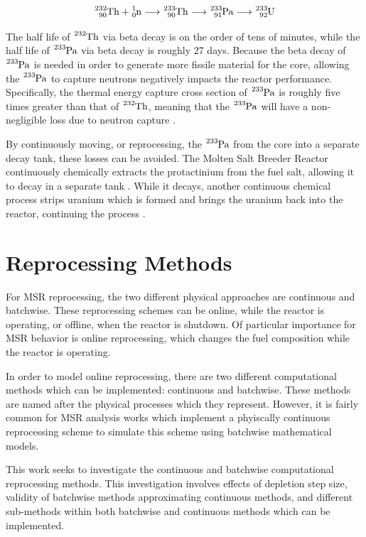 \begin{equation} \hfill
\ce{^{232}_{90}Th} + \ce{^{1}_{0}n} \longrightarrow \ce{^{233}_{90}Th} \longrightarrow \ce{^{233}_{91}Pa} \longrightarrow \ce{^{233}_{92}U}
\hfill\label{eq:th-pa-chain} \end{equation}

The half life of $\ce{^{232}Th}$ via beta decay is on the order of tens of minutes, while the half life of $\ce{^{233}Pa}$ via beta decay is roughly 27 days. 
Because the beta decay of $\ce{^{233}Pa}$ is needed in order to generate more fissile material for the core, allowing the $\ce{^{233}Pa}$ to capture neutrons negatively impacts the reactor performance.
Specifically, the thermal energy capture cross section of $\ce{^{233}Pa}$ is roughly five times greater than that of $\ce{^{232}Th}$, meaning that the $\ce{^{233}Pa}$ will have a non-negligible loss due to neutron capture \cite{chadwick_endfb-vii1_2011}.

By continuously moving, or reprocessing, the $\ce{^{233}Pa}$ from the core into a separate decay tank, these losses can be avoided.
The Molten Salt Breeder Reactor continuously chemically extracts the protactinium from the fuel salt, allowing it to decay in a separate tank \cite{robertson_conceptual_1971}.
While it decays, another continuous chemical process strips uranium which is formed and brings the uranium back into the reactor, continuing the process \cite{robertson_conceptual_1971}.

\section{Reprocessing Methods}

For MSR reprocessing, the two different physical approaches are continuous and batchwise. These reprocessing schemes can be online, while the reactor is operating, or offline, when the reactor is shutdown. Of particular importance for MSR behavior is online reprocessing, which changes the fuel composition while the reactor is operating.

In order to model online reprocessing, there are two different computational methods which can be implemented: continuous and batchwise. These methods are named after the physical processes which they represent.
However, it is fairly common for MSR analysis works which implement a phyiscally continuous reprocessing scheme to simulate this scheme using batchwise mathematical models.

This work seeks to investigate the continuous and batchwise computational reprocessing methods. This investigation involves effects of depletion step size, validity of batchwise methods approximating continuous methods, and different sub-methods within both batchwise and continuous methods which can be implemented.
